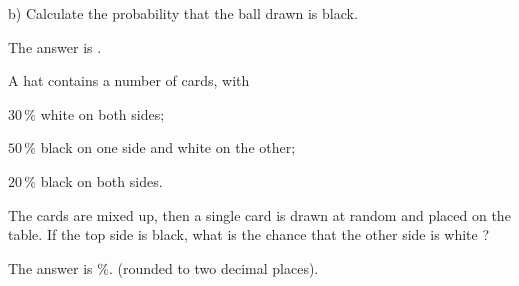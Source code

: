 \documentclass{ximera}
\begin{document}
\begin{question}
b) Calculate the probability that the ball drawn is black.
     \begin{solution}
           The answer is .
     \end{solution}
\end{question}

\begin{question}
A hat contains a number of cards, with

$30\,\%$ white on both sides;

$50\,\%$ black on one side and white on the other;

$20\,\%$ black on both sides.

The cards are mixed up, then a single card is drawn at random and placed on the table. If the top side is black, what is the chance that the other side is white ?
     \begin{solution}
           The answer is  $\%$. (rounded to two decimal places).
     \end{solution}
\end{question}
\end{document}
